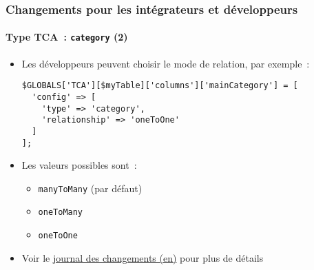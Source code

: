 %

\begin{frame}[fragile]
	\frametitle{Changements pour les intégrateurs et développeurs}
	\framesubtitle{Type TCA~: \texttt{category} (2)}


	\begin{itemize}
		\item Les développeurs peuvent choisir le mode de relation, par exemple~:
\begin{lstlisting}
$GLOBALS['TCA'][$myTable]['columns']['mainCategory'] = [
  'config' => [
    'type' => 'category',
    'relationship' => 'oneToOne'
  ]
];
\end{lstlisting}

		\item Les valeurs possibles sont~:
			\begin{itemize}
				\item \texttt{manyToMany} (par défaut)
				\item \texttt{oneToMany}
				\item \texttt{oneToOne}
			\end{itemize}

		\item Voir le \href{https://docs.typo3.org/c/typo3/cms-core/master/en-us/Changelog/11.4/Feature-94622-NewTCATypeCategory.html}{journal des changements (en)} pour plus de détails

	\end{itemize}

\end{frame}

